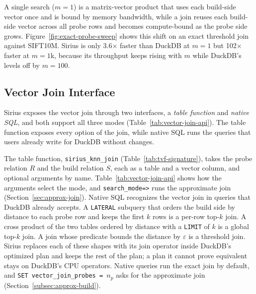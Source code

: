 

A single search ($m=1$) is a matrix-vector product that uses each build-side vector once and is bound by memory bandwidth, while a join reuses each build-side vector across all probe rows and becomes compute-bound as the probe side grows.
Figure~\ref{fig:exact-probe-sweep} shows this shift on an exact threshold join against SIFT10M\@.
Sirius is only 3.6$\times$ faster than DuckDB at $m=1$ but 102$\times$ faster at $m=1$k, because its throughput keeps rising with $m$ while DuckDB's levels off by $m=100$.

\subsection{Vector Join Interface}\label{subsec:vector-join-interface}



Sirius exposes the vector join through two interfaces, a \textit{table function} and \textit{native SQL}, and both support all three modes (Table~\ref{tab:vector-join-api}).
The table function exposes every option of the join, while native SQL runs the queries that users already write for DuckDB without changes.



The table function, \texttt{sirius\_knn\_join} (Table~\ref{tab:tvf-signature}), takes the probe relation $R$ and the build relation $S$, each as a table and a vector column, and optional arguments by name.
Table~\ref{tab:vector-join-api} shows how the arguments select the mode, and \texttt{search\_mode=>} runs the approximate join (Section~\ref{sec:approx-join}).
Native SQL recognizes the vector join in queries that DuckDB already accepts.
A \texttt{LATERAL} subquery that orders the build side by distance to each probe row and keeps the first $k$ rows is a per-row top-$k$ join.
A cross product of the two tables ordered by distance with a \texttt{LIMIT} of $k$ is a global top-$k$ join.
A join whose predicate bounds the distance by $\varepsilon$ is a threshold join.
Sirius replaces each of these shapes with its join operator inside DuckDB's optimized plan and keeps the rest of the plan; a plan it cannot prove equivalent stays on DuckDB's CPU operators.
Native queries run the exact join by default, and \texttt{SET vector\_join\_probes = $n_p$} asks for the approximate join (Section~\ref{subsec:approx-build}).

